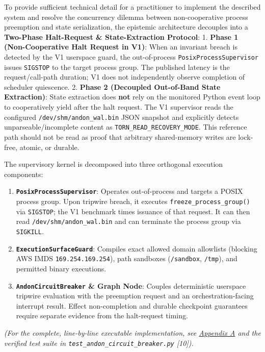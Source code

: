 \documentclass[
  10pt,letterpaper]{article}
\providecommand{\tightlist}{%
  \setlength{\itemsep}{0pt}\setlength{\parskip}{0pt}}
\begin{document}
To provide sufficient technical detail for a practitioner to implement
the described system and resolve the concurrency dilemma between
non-cooperative process preemption and state serialization, the
epistemic architecture decouples into a \textbf{Two-Phase Halt-Request \&
State-Extraction Protocol}: 1. \textbf{Phase 1 (Non-Cooperative Halt Request
in V1)}: When an invariant breach is detected by the V1 userspace guard,
the out-of-process \texttt{PosixProcessSupervisor} issues \texttt{SIGSTOP}
to the target process group. The published latency is the request/call-path
duration; V1 does not independently observe completion of scheduler
quiescence. 2. \textbf{Phase 2 (Decoupled Out-of-Band State Extraction)}:
State extraction does \textbf{not} rely on the monitored Python event loop
to cooperatively yield after the halt request. The V1 supervisor reads the
configured \texttt{/dev/shm/andon\_wal.bin} JSON snapshot and explicitly
detects unparseable/incomplete content as
\texttt{TORN\_READ\_RECOVERY\_MODE}. This reference path should not be
read as proof that arbitrary shared-memory writes are lock-free, atomic, or
durable.

The supervisory kernel is decomposed into three orthogonal execution
components:

\begin{enumerate}
\def\labelenumi{\arabic{enumi}.}
\tightlist
\item
  \textbf{\texttt{PosixProcessSupervisor}}: Operates out-of-process and
  targets a POSIX process group. Upon tripwire breach, it executes
  \texttt{freeze\_process\_group()} via \texttt{SIGSTOP}; the V1 benchmark
  times issuance of that request. It can then read
  \texttt{/dev/shm/andon\_wal.bin} and can terminate the process group via
  \texttt{SIGKILL}.
\item
  \textbf{\texttt{ExecutionSurfaceGuard}}: Compiles exact allowed domain
  allowlists (blocking AWS IMDS \texttt{169.254.169.254}), path
  sandboxes (\texttt{/sandbox}, \texttt{/tmp}), and permitted binary
  executions.
\item
  \textbf{\texttt{AndonCircuitBreaker} \& Graph Node}: Couples
  deterministic userspace tripwire evaluation with the preemption request
  and an orchestration-facing interrupt result. Effect non-completion and
  durable checkpoint guarantees require separate evidence from the
  halt-request timing.
\end{enumerate}

\emph{(For the complete, line-by-line executable implementation, see
\hyperref[appendix-a-out-of-band-posix-supervisor-reference-implementation]{Appendix
A} and the verified test suite in
\texttt{test\_andon\_circuit\_breaker.py}
{[}10{]}).}
\end{document}
